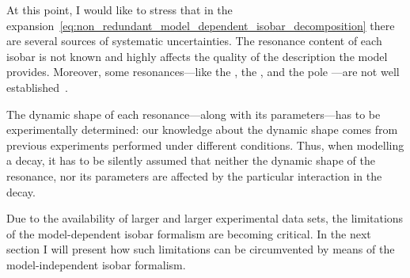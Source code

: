     At this point, I would like to stress that in the expansion~\eqref{eq:non_redundant_model_dependent_isobar_decomposition} there are several sources of systematic uncertainties.
    The resonance content of each isobar is not known and highly affects the quality of the description the model provides.
    Moreover, some resonances---like the \Pfnez{}, the \Pfotsz, and the pole \Psigma{}---are not well established~\cite[\S~B]{PhysRevD.76.012001}.


    The dynamic shape of each resonance---along with its parameters---has to be experimentally determined: our knowledge about the dynamic shape comes from previous experiments performed under different conditions.
    Thus, when modelling a decay, it has to be silently assumed that neither the dynamic shape of the resonance, nor its parameters are affected by the particular interaction in the decay.


    Due to the availability of larger and larger experimental data sets, the limitations of the model-dependent isobar formalism are becoming critical.
    In the next section I will present how such limitations can be circumvented by means of the model-independent isobar formalism.


